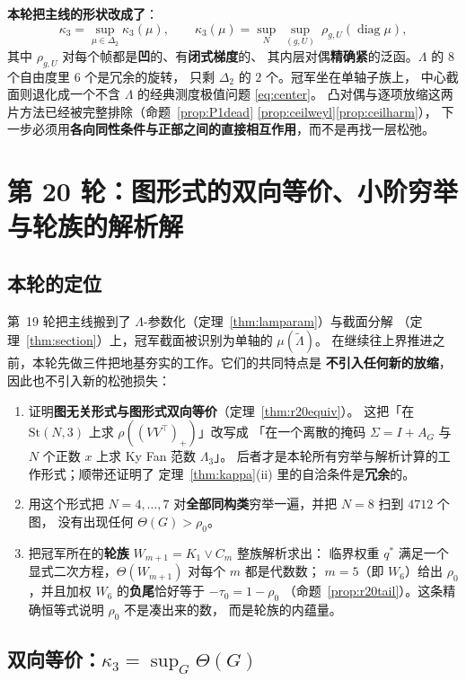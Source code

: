 \documentclass[UTF8,11pt]{ctexart}
\theoremstyle{definition}
\newcommand{\Lam}{\Lambda}
\begin{document}
\textbf{本轮把主线的形状改成了}：
\[
\kappa_3=\sup_{\mu\in\Delta_2}\kappa_3(\mu),\qquad
\kappa_3(\mu)=\sup_{N}\ \sup_{(g,U)}\ \rho_{g,U}(\operatorname{diag}\mu),
\]
其中 $\rho_{g,U}$ 对每个帧都是\textbf{凹}的、有\textbf{闭式梯度}的、
其内层对偶\textbf{精确紧}的泛函。$\Lam$ 的 $8$ 个自由度里 $6$ 个是冗余的旋转，
只剩 $\Delta_2$ 的 $2$ 个。冠军坐在单轴子族上，
中心截面则退化成一个不含 $\Lam$ 的经典测度极值问题 \eqref{eq:center}。
凸对偶与逐项放缩这两片方法已经被完整排除（命题~\ref{prop:P1dead}%
\ref{prop:ceilweyl}\ref{prop:ceilharm}），
下一步必须用\textbf{各向同性条件与正部之间的直接相互作用}，而不是再找一层松弛。


\section{第 20 轮：图形式的双向等价、小阶穷举与轮族的解析解}\label{sec:r20}

\subsection{本轮的定位}\label{sec:r20:motiv}

第~19 轮把主线搬到了 $\Lam$-参数化（定理~\ref{thm:lamparam}）与截面分解
（定理~\ref{thm:section}）上，冠军截面被识别为单轴的 $\mu(\tilde\Lam)$。
在继续往上界推进之前，本轮先做三件把地基夯实的工作。它们的共同特点是
\textbf{不引入任何新的放缩}，因此也不引入新的松弛损失：

\begin{enumerate}\itemsep2pt
\item[(i)] 证明\textbf{图无关形式与图形式双向等价}（定理~\ref{thm:r20equiv}）。
这把「在 $\mathrm{St}(N,3)$ 上求 $\rho((VV^\top)_+)$」改写成
「在一个离散的掩码 $\Sigma=I+A_G$ 与 $N$ 个正数 $x$ 上求 Ky Fan 范数 $\Lam_3$」。
后者才是本轮所有穷举与解析计算的工作形式；顺带还证明了
定理~\ref{thm:kappa}(ii) 里的自洽条件是\textbf{冗余}的。
\item[(ii)] 用这个形式把 $N=4,\dots,7$ 对\textbf{全部同构类}穷举一遍，并把 $N=8$ 扫到 $4712$ 个图，
没有出现任何 $\Theta(G)>\rho_0$。
\item[(iii)] 把冠军所在的\textbf{轮族} $W_{m+1}=K_1\vee C_m$ 整族解析求出：
临界权重 $q^*$ 满足一个显式二次方程，$\Theta(W_{m+1})$ 对每个 $m$ 都是代数数；
$m=5$（即 $W_6$）给出 $\rho_0$，并且加权 $W_6$ 的\textbf{负尾}恰好等于 $-\tau_0=1-\rho_0$
（命题~\ref{prop:r20tail}）。这条精确恒等式说明 $\rho_0$ 不是凑出来的数，
而是轮族的内蕴量。
\end{enumerate}

\subsection{双向等价：$\kappa_3=\sup_G\Theta(G)$}\label{sec:r20:equiv}
\end{document}
